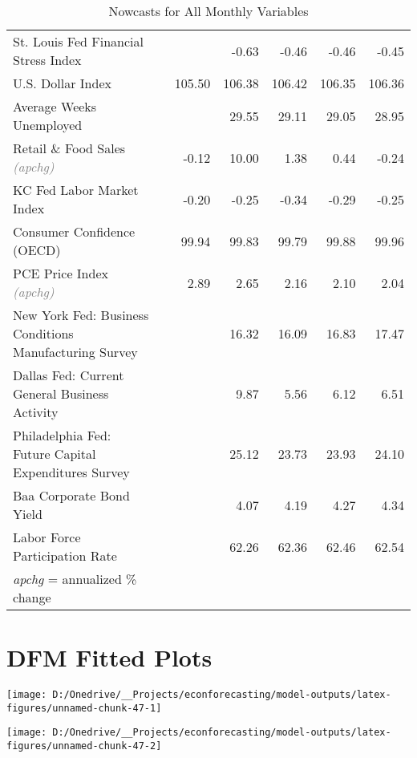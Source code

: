 \documentclass[11pt, letterpaper]{article}\usepackage[]{graphicx}\usepackage[]{color}
\begin{document}
\begin{table}[H]
\begin{tabular}{lrrrrrr}
  St. Louis Fed Financial Stress Index &  &  & -0.63 & -0.46 & -0.46 & -0.45 \\ 
  U.S. Dollar Index &  & 105.50 & 106.38 & 106.42 & 106.35 & 106.36 \\ 
  Average Weeks Unemployed &  &  & 29.55 & 29.11 & 29.05 & 28.95 \\ 
  Retail \& Food Sales \textit{\footnotesize\textcolor{gray}{(apchg)}} &  & -0.12 & 10.00 & 1.38 & 0.44 & -0.24 \\ 
  KC Fed Labor Market Index &  & -0.20 & -0.25 & -0.34 & -0.29 & -0.25 \\ 
  Consumer Confidence (OECD) &  & 99.94 & 99.83 & 99.79 & 99.88 & 99.96 \\ 
  PCE Price Index \textit{\footnotesize\textcolor{gray}{(apchg)}} &  & 2.89 & 2.65 & 2.16 & 2.10 & 2.04 \\ 
  New York Fed: Business Conditions Manufacturing Survey &  &  & 16.32 & 16.09 & 16.83 & 17.47 \\ 
  Dallas Fed: Current General Business Activity &  &  & 9.87 & 5.56 & 6.12 & 6.51 \\ 
  Philadelphia Fed: Future Capital Expenditures Survey &  &  & 25.12 & 23.73 & 23.93 & 24.10 \\ 
  Baa Corporate Bond Yield &  &  & 4.07 & 4.19 & 4.27 & 4.34 \\ 
  Labor Force Participation Rate &  &  & 62.26 & 62.36 & 62.46 & 62.54 \\ 
   \hline 
 \textit{apchg} = annualized \% change 
\end{tabular}
\endgroup
\caption{Nowcasts for All Monthly Variables} 
\end{table}



\appendix
\appendixpage
\addappheadtotoc

\section{DFM Fitted Plots}


{\centering \texttt{[image: D:/Onedrive/\_\_Projects/econforecasting/model-outputs/latex-figures/unnamed-chunk-47-1]} 

}




{\centering \texttt{[image: D:/Onedrive/\_\_Projects/econforecasting/model-outputs/latex-figures/unnamed-chunk-47-2]} 

}
\end{document}

